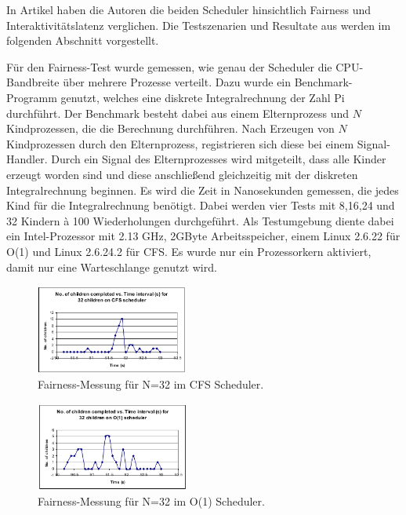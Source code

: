 In Artikel \cite{papercomparison} haben die Autoren die beiden Scheduler hinsichtlich Fairness und Interaktivitätslatenz verglichen. Die Testszenarien und  Resultate aus \cite{papercomparison} werden im folgenden Abschnitt vorgestellt.

Für den Fairness-Test wurde gemessen, wie genau der Scheduler die CPU-Bandbreite über mehrere Prozesse verteilt. Dazu wurde ein Benchmark-Programm genutzt, welches eine diskrete Integralrechnung der Zahl Pi durchführt. Der Benchmark besteht dabei aus einem Elternprozess und $N$ Kindprozessen, die die Berechnung durchführen. Nach Erzeugen von $N$ Kindprozessen durch den Elternprozess, registrieren sich diese bei einem Signal-Handler. Durch ein Signal des Elternprozesses wird mitgeteilt, dass alle Kinder erzeugt worden sind und diese anschließend gleichzeitig mit der diskreten Integralrechnung beginnen. Es wird die Zeit in Nanosekunden gemessen, die jedes Kind für die Integralrechnung benötigt. Dabei werden vier Tests mit 8,16,24 und 32 Kindern à 100 Wiederholungen durchge\-führt. Als Testumgebung diente dabei ein Intel-Prozessor mit 2.13 GHz, 2GByte Arbeitsspeicher, einem Linux 2.6.22 für O(1) und Linux 2.6.24.2 für CFS. Es wurde nur ein Prozessorkern aktiviert, damit nur eine Warteschlange genutzt wird.  
\begin{figure} [h]
	\centering
	\includegraphics[width=0.45\textwidth]{pictures/fairness_32_cfs.png}
	\caption{Fairness-Messung für N=32 im CFS Scheduler.}
	\label{fig:fair_meas_cfs}
\end{figure}
\begin{figure} [h]
 	\centering
 	\includegraphics[width=0.45\textwidth]{pictures/fairness_32_O1.png}
 	\caption{Fairness-Messung für N=32 im O(1) Scheduler.}
 	\label{fig:fair_meas_o1}
\end{figure}

